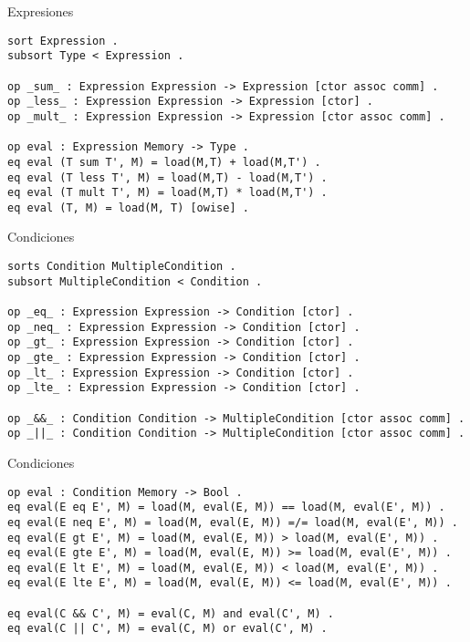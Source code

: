 \documentclass{beamer}
\begin{document}
    \begin{frame}[fragile]{Expresiones}
        \begin{verbatim}
sort Expression .
subsort Type < Expression .
        
op _sum_ : Expression Expression -> Expression [ctor assoc comm] .
op _less_ : Expression Expression -> Expression [ctor] .
op _mult_ : Expression Expression -> Expression [ctor assoc comm] .

op eval : Expression Memory -> Type .
eq eval (T sum T', M) = load(M,T) + load(M,T') .
eq eval (T less T', M) = load(M,T) - load(M,T') .
eq eval (T mult T', M) = load(M,T) * load(M,T') .
eq eval (T, M) = load(M, T) [owise] .
        \end{verbatim}
    \end{frame}

    \begin{frame}[fragile]{Condiciones}
        \begin{verbatim}
sorts Condition MultipleCondition .
subsort MultipleCondition < Condition .
        
op _eq_ : Expression Expression -> Condition [ctor] .
op _neq_ : Expression Expression -> Condition [ctor] .
op _gt_ : Expression Expression -> Condition [ctor] .
op _gte_ : Expression Expression -> Condition [ctor] .
op _lt_ : Expression Expression -> Condition [ctor] .
op _lte_ : Expression Expression -> Condition [ctor] .
        
op _&&_ : Condition Condition -> MultipleCondition [ctor assoc comm] .
op _||_ : Condition Condition -> MultipleCondition [ctor assoc comm] .
        \end{verbatim}
    \end{frame}

    \begin{frame}[fragile]{Condiciones}
        \begin{verbatim}
op eval : Condition Memory -> Bool .
eq eval(E eq E', M) = load(M, eval(E, M)) == load(M, eval(E', M)) .
eq eval(E neq E', M) = load(M, eval(E, M)) =/= load(M, eval(E', M)) .
eq eval(E gt E', M) = load(M, eval(E, M)) > load(M, eval(E', M)) .
eq eval(E gte E', M) = load(M, eval(E, M)) >= load(M, eval(E', M)) .
eq eval(E lt E', M) = load(M, eval(E, M)) < load(M, eval(E', M)) .
eq eval(E lte E', M) = load(M, eval(E, M)) <= load(M, eval(E', M)) .
            
eq eval(C && C', M) = eval(C, M) and eval(C', M) .
eq eval(C || C', M) = eval(C, M) or eval(C', M) .
        \end{verbatim}
    \end{frame}
\end{document}
